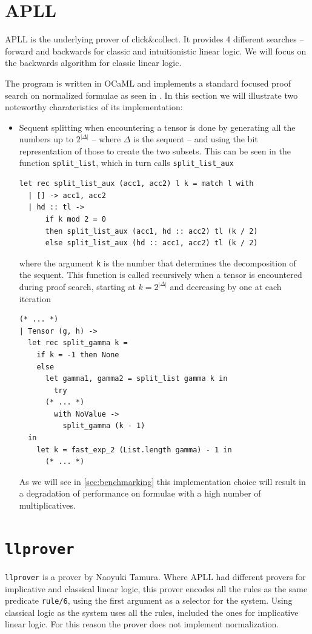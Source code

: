\documentclass[a4paper, 12pt, english]{report}
\begin{document}
\section{APLL}\label{sec:apll}
APLL is the underlying prover of click\&collect. %
It provides 4 different searches -- forward and backwards for classic and intuitionistic linear logic. 
We will focus on the backwards algorithm for classic linear logic.


The program is written in OCaML and implements a standard focused proof search on normalized formulae as seen in \cite{LiangMiller}.
In this section we will illustrate two noteworthy charateristics of its implementation:
\begin{itemize}
	\item Sequent splitting when encountering a tensor is done by generating all the numbers up to $2^{|\Delta|}$ -- where $\Delta$ is the sequent -- and using the bit representation of those to create the two subsets.
		This can be seen in the function \texttt{split\_list}, which in turn calls \texttt{split\_list\_aux}
		\begin{verbatim}
let rec split_list_aux (acc1, acc2) l k = match l with
  | [] -> acc1, acc2
  | hd :: tl -> 
      if k mod 2 = 0 
      then split_list_aux (acc1, hd :: acc2) tl (k / 2)
      else split_list_aux (hd :: acc1, acc2) tl (k / 2)
		\end{verbatim}
		where the argument \texttt{k} is the number that determines the decomposition of the sequent.
		This function is called recursively when a tensor is encountered during proof search, starting at $ k = 2^{|\Delta|}$ and decreasing by one at each iteration
		\begin{verbatim}
(* ... *)
| Tensor (g, h) ->
  let rec split_gamma k = 
    if k = -1 then None
    else
      let gamma1, gamma2 = split_list gamma k in
        try
	  (* ... *)
        with NoValue ->
          split_gamma (k - 1) 
  in
    let k = fast_exp_2 (List.length gamma) - 1 in
      (* ... *)
		\end{verbatim}

		As we will see in \ref{sec:benchmarking} this implementation choice will result in a degradation of performance on formulae with a high number of multiplicatives.
\end{itemize}

\section{\texttt{llprover}}
\texttt{llprover} is a prover by Naoyuki Tamura.
Where APLL had different provers for implicative and classical linear logic, this prover encodes all the rules as the same predicate \texttt{rule/6}, using the first argument as a selector for the system.
Using classical logic as the system uses all the rules, included the ones for implicative linear logic.
For this reason the prover does not implement normalization.
\end{document}
